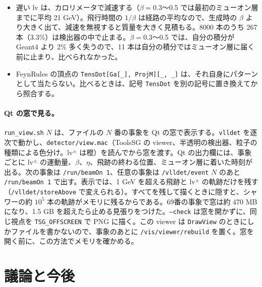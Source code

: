 \documentclass[a4paper,10pt]{ltjsarticle}
\begin{document}
\begin{itemize}
\item 遅い lv は、カロリメータで減速する（$\beta=0.3$〜0.5 では最初のミューオン層までに平均 21 GeV）。飛行時間の $1/\beta$ は経路の平均なので、生成時の $\beta$ より大きく出て、減速を無視すると質量を大きく見積もる。8000 本のうち 267 本（3.3\%）は検出器の中で止まる。$\beta=0.3$〜0.5 では、自分の積分が Geant4 より 2\% 多く失うので、11 本は自分の積分ではミューオン層に届く前に止まり、比べられなかった。
\item FeynRules の頂点の \texttt{TensDot[Ga[\_], ProjM][\_, \_]} は、それ自身にパターンとして当たらない。比べるときは、記号 \texttt{TensDot} を別の記号に置き換えてから照合する。
\end{itemize}

\paragraph{Qt の窓で見る。}\texttt{run\_view.sh} $N$ は、ファイルの $N$ 番の事象を Qt の窓で表示する。\texttt{vlldet} を逐次で動かし、\texttt{detector/view.mac}（ToolsSG の viewer、半透明の検出器、粒子の種類による色分け。lv$^\pm$ は橙）を読んでから窓を渡す。Qt の出力欄には、事象ごとに lv$^\pm$ の運動量、$\beta$、$\eta$、飛跡の終わる位置、ミューオン層に着いた時刻が出る。次の事象は \texttt{/run/beamOn 1}、任意の事象は \texttt{/vlldet/event} $N$ のあと \texttt{/run/beamOn 1} で出す。表示では、1 GeV を超える飛跡と lv$^\pm$ の軌跡だけを残す（\texttt{/vlldet/storeAbove} で変えられる）。すべてを残して描くときに隠すと、シャワーの約 $10^5$ 本の軌跡がメモリに残るからである。69番の事象で窓は約 470 MB になり、1.5 GB を超えたら止める見張りをつけた。\texttt{--check} は窓を開かずに、同じ視点を \texttt{TSG\_OFFSCREEN} で PNG に描く。この viewer は \texttt{DrawView} のときにしかファイルを書かないので、事象のあとに \texttt{/vis/viewer/rebuild} を置く。窓を開く前に、この方法でメモリを確かめる。

\section{議論と今後}\label{sec:discussion}
\end{document}
